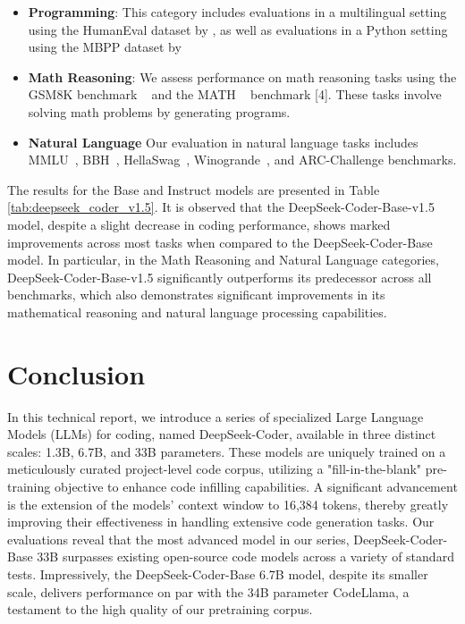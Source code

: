 \begin{itemize}
    \item \textbf{Programming}: This category includes evaluations in a multilingual setting using the HumanEval dataset by \cite{chen2021evaluating}, as well as evaluations in a Python setting using the MBPP dataset by \cite{austin2021program}
    \item \textbf{Math Reasoning}: We assess performance on math reasoning tasks using the GSM8K benchmark ~\citep{gsm8k} and the MATH ~\citep{hendrycks2021measuring} benchmark [4]. These tasks involve solving math problems by generating programs.
    \item \textbf{Natural Language} Our evaluation in natural language tasks includes  MMLU~\citep{hendrycks2020measuring}, BBH~\citep{suzgun2022challenging}, HellaSwag~\citep{zellers2019hellaswag}, Winogrande~\citep{sakaguchi2021winogrande}, and ARC-Challenge \citep{clark2018think} benchmarks.
\end{itemize}

The results for the Base and Instruct models are presented in Table \ref{tab:deepseek_coder_v1.5}. It is observed that the DeepSeek-Coder-Base-v1.5 model, despite a slight decrease in coding performance, shows marked improvements across most tasks when compared to the DeepSeek-Coder-Base model. In particular, in the Math Reasoning and Natural Language categories, DeepSeek-Coder-Base-v1.5 significantly outperforms its predecessor across all benchmarks, which also demonstrates significant improvements in its mathematical reasoning and natural language processing capabilities.

\section{Conclusion}

In this technical report, we introduce a series of specialized Large Language Models (LLMs) for coding, named DeepSeek-Coder, available in three distinct scales: 1.3B, 6.7B, and 33B parameters. These models are uniquely trained on a meticulously curated project-level code corpus, utilizing a "fill-in-the-blank" pre-training objective to enhance code infilling capabilities. A significant advancement is the extension of the models' context window to 16,384 tokens, thereby greatly improving their effectiveness in handling extensive code generation tasks. Our evaluations reveal that the most advanced model in our series, DeepSeek-Coder-Base 33B surpasses existing open-source code models across a variety of standard tests. Impressively, the DeepSeek-Coder-Base 6.7B model, despite its smaller scale, delivers performance on par with the 34B parameter CodeLlama, a testament to the high quality of our pretraining corpus.

